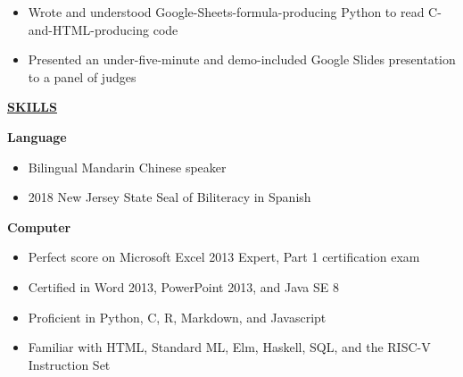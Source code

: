 \documentclass[
]{article}
\providecommand{\tightlist}{%
  \setlength{\itemsep}{0pt}\setlength{\parskip}{0pt}}
\begin{document}
\begin{itemize}
\tightlist
\item
Wrote and understood Google-Sheets-formula-producing Python to read C-and-HTML-producing code
\end{itemize}

\begin{itemize}
\tightlist
\item
Presented an under-five-minute and demo-included Google Slides presentation to a panel of judges
\end{itemize}



\textbf{\underline{SKILLS}}

\textbf{Language}

\begin{itemize}
\item
  Bilingual Mandarin Chinese speaker 
\item
  2018 New Jersey State Seal of Biliteracy in Spanish
\end{itemize}

\textbf{Computer}

\begin{itemize}
\item
  Perfect score on Microsoft Excel 2013 Expert, Part 1 certification
  exam
\item
  Certified in Word 2013, PowerPoint 2013, and Java SE 8
\end{itemize}

\begin{itemize}
\item
  Proficient in Python, C, R, Markdown, and Javascript
\item
  Familiar with HTML, Standard ML, Elm, Haskell, SQL, and the RISC-V
  Instruction Set
\end{itemize}
\end{document}
